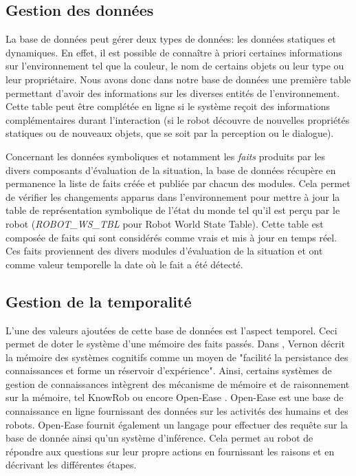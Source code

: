 \documentclass[a4paper,11pt,twoside]{StyleThese}
\begin{document}
\subsection{Gestion des données}
\label{sec:dbd}
La base de données peut gérer deux types de données: les données statiques et dynamiques. En effet, il est possible de connaître à priori certaines informations sur l'environnement tel que la couleur, le nom de certains objets ou leur type ou leur propriétaire. 
Nous avons donc dans notre base de données une première table permettant d'avoir des informations sur les diverses entités de l'environnement. Cette table peut être complétée en ligne si le système reçoit des informations complémentaires durant l'interaction (si le robot découvre de nouvelles propriétés statiques ou de nouveaux objets, que se soit par la perception ou le dialogue).

Concernant les données symboliques et notamment les \textit{faits} produits par les divers composants d'évaluation de la situation, la base de données récupère en permanence la liste de faits créée et publiée par chacun des modules. Cela permet de vérifier les changements apparus dans l'environnement pour mettre à jour la table de représentation symbolique de l'état du monde tel qu'il est perçu par le robot (\textit{ROBOT\_WS\_TBL} pour Robot World State Table).
Cette table est composée de faits qui sont considérés comme vrais et mis à jour en temps réel. Ces faits proviennent des divers modules d'évaluation de la situation et ont comme valeur temporelle la date où le fait a été détecté.


\subsection{Gestion de la temporalité}
\label{sec:dbt}
L'une des valeurs ajoutées de cette base de données est l'aspect temporel.
Ceci permet de doter le système d'une mémoire des faits passés.
Dans \cite{vernon2014artificial}, Vernon décrit la mémoire des systèmes cognitifs comme un moyen de "facilité la persistance des connaissances et forme un réservoir d'expérience".
Ainsi, certains systèmes de gestion de connaissances intègrent des mécanisme de mémoire et de raisonnement sur la mémoire, tel KnowRob \cite{tenorth2015representations} ou encore Open-Ease \cite{beetz2015open}.
Open-Ease est une base de connaissance en ligne fournissant des données sur les activités des humains et des robots. Open-Ease fournit également un langage pour effectuer des requête sur la base de donnée ainsi qu'un système d'inférence. Cela permet au robot de répondre aux questions sur leur propre actions en fournissant les raisons et en décrivant les différentes étapes.
\end{document}

